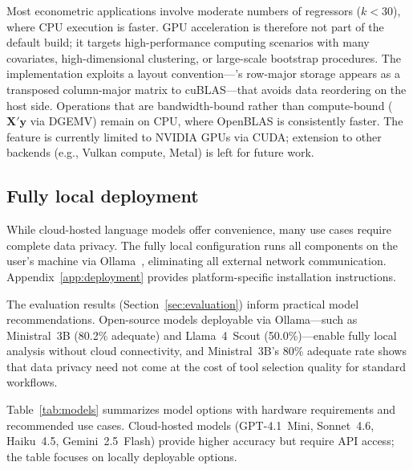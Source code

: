 Most econometric applications involve moderate numbers of regressors
($k < 30$), where CPU execution is faster. GPU acceleration is
therefore not part of the default build; it targets high-performance
computing scenarios with many covariates, high-dimensional clustering,
or large-scale bootstrap procedures. The implementation exploits a
layout convention---'s row-major storage appears as a
transposed column-major matrix to cuBLAS---that avoids data
reordering on the host side. Operations that are bandwidth-bound
rather than compute-bound ($\bm{X}'\bm{y}$ via DGEMV) remain
on CPU, where OpenBLAS is consistently faster. The feature is
currently limited to NVIDIA GPUs via CUDA; extension to other
backends (e.g., Vulkan compute, Metal) is left for future work.

\subsection{Fully local deployment} \label{sec:local}

While cloud-hosted language models offer convenience, many use cases
require complete data privacy. The fully local configuration runs all
components on the user's machine via Ollama~\citep{Ollama}, eliminating
all external network communication. Appendix~\ref{app:deployment}
provides platform-specific installation instructions.

The evaluation results (Section~\ref{sec:evaluation}) inform practical
model recommendations. Open-source models deployable via Ollama---such
as Ministral~3B (80.2\% adequate) and Llama~4~Scout (50.0\%)---enable
fully local analysis without cloud connectivity, and Ministral~3B's
80\% adequate rate shows that data privacy need not come at the cost
of tool selection quality for standard workflows.

Table~\ref{tab:models} summarizes model options with hardware
requirements and recommended use cases.  Cloud-hosted models
(GPT-4.1~Mini, Sonnet~4.6, Haiku~4.5, Gemini~2.5~Flash) provide
higher accuracy but require API access; the table focuses on locally
deployable options.

